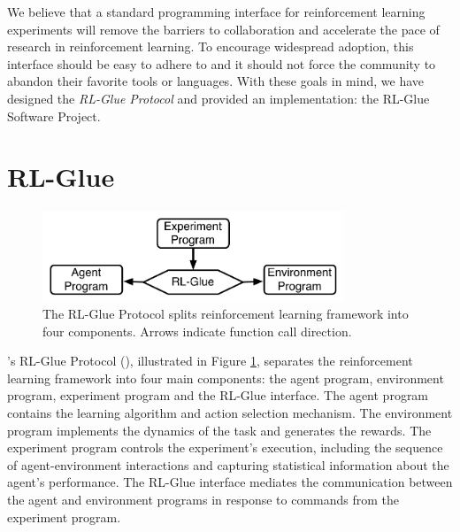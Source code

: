 \documentclass[twoside,11pt]{article}
\begin{document}
We believe that a standard programming interface for reinforcement learning experiments will remove the barriers to collaboration and accelerate the pace of research in reinforcement learning.  To encourage widespread adoption, this interface should be easy to adhere to and it should not force the community to abandon their favorite tools or languages.  With these goals in mind, we have designed the \textit{RL-Glue Protocol} and provided an implementation: the RL-Glue Software Project.





	 

\section{RL-Glue}

\begin{figure}[ht]
\begin{center}
\includegraphics[width=9cm]{glue.pdf}
\vspace{-0.2cm}
\caption{\small The RL-Glue Protocol splits reinforcement learning framework into four components.  Arrows indicate function call direction.}\label{fig:RLDIA}
\end{center}
\vspace{-0.4cm}
\end{figure}

\citeauthor{whitesutton}'s RL-Glue Protocol (\citeyear{whitesutton}), illustrated in Figure \ref{fig:RLDIA}, separates the reinforcement learning framework into four main components: the agent program, environment program, experiment program and the RL-Glue interface. The agent program contains the learning algorithm and action selection mechanism. The environment program implements the dynamics of the task and generates the rewards. The experiment program controls the experiment's execution, including the sequence of agent-environment interactions and capturing statistical information about the agent's performance.  The RL-Glue interface mediates the communication between the agent and environment programs in response to commands from the experiment program. 
\end{document}
